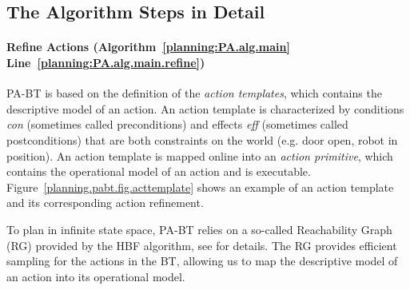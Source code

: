 %





%
%


\subsection{The Algorithm Steps in Detail}

\paragraph*{\textbf{Refine Actions (Algorithm~\ref{planning:PA.alg.main} Line~\ref{planning:PA.alg.main.refine})}\\}

PA-BT is based on the definition of the \emph{action templates}, which contains the descriptive model of an action. An action template is characterized by conditions \emph{con} (sometimes called preconditions) and effects \emph{eff} (sometimes called postconditions) that are both constraints on the world (e.g. door open, robot in position). An action template is mapped online into an \emph{action primitive}, which contains the operational model of an action and is executable. Figure~\ref{planning.pabt.fig.acttemplate} shows an example of an action template and its corresponding action refinement.


To plan in infinite state space, PA-BT relies on a so-called Reachability Graph (RG) provided by the HBF algorithm, see \cite{garrettbackward} for details.
The RG provides efficient sampling for the actions in the BT, allowing us to map the descriptive model of an action into its operational model. 

